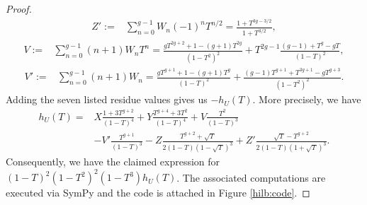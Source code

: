 \documentclass[11pt]{amsart}
\theoremstyle{definition}
\begin{document}
\begin{proof}
\begin{equation*}
\begin{aligned}
    Z' := &\sum_{n=0}^{g-1} W_n(-1)^nT^{n/2} = \frac{1+T^{3g-3/2}}{1+T^{3/2}},
    \end{aligned}
\end{equation*}
\begin{equation*} \begin{aligned}
    V := &\sum_{n=0}^{g-1}(n+1)W_nT^n = \frac{gT^{2g+2}+1-(g+1)T^{2g}}{(1-T^2)^2}+T^{2g-1}\frac{(g-1)+T^g-gT}{(1-T)^2},
    \end{aligned}
\end{equation*}
\begin{equation*}
\begin{aligned}
    V' := &\sum_{n=0}^{g-1} (n+1)W_n =\frac{gT^{g+1}+1-(g+1)T^g}{(1-T)^2}+\frac{(g-1)T^{g+1}+T^{3g+1}-gT^{g+3}}{(1-T^2)^2}.
    \end{aligned}
\end{equation*}
\noindent Adding the seven listed residue values gives us $-h_U(T)$. More precisely, we have  
\begin{equation*}\begin{aligned}h_U(T)= & X\frac{1+3T^{g+2}}{(1-T)^4}+Y\frac{T^{g+4}+3T^2}{(1-T)^4}+V\frac{T^2}{(1-T)^3}\\ &-V'\frac{T^{g+1}}{(1-T)^3}-Z\frac{T^{g+2}+\sqrt{T}}{2(1-T)(1-\sqrt{T})^3}+Z'\frac{\sqrt{T}-T^{g+2}}{2(1-T)(1+\sqrt{T})^3}.\end{aligned}\end{equation*}
Consequently, we have the claimed expression for $(1-T)^2(1-T^2)^2(1-T^3)h_U(T)$. 
The associated computations are executed via SymPy and the code is attached in Figure \ref{hilb:code}.
\end{proof}
\end{document}
